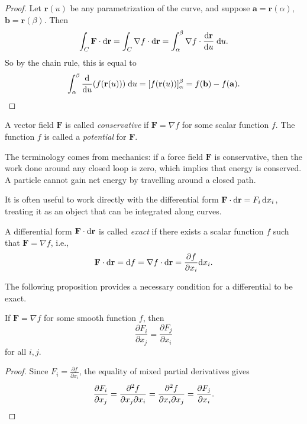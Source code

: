 \documentclass[a4paper]{article}
\begin{document}
\begin{proof}
  Let $\mathbf{r}(u)$ be any parametrization of the curve, and suppose $\mathbf{a} = \mathbf{r}(\alpha)$, $\mathbf{b} = \mathbf{r}(\beta)$. Then
  \[
    \int_C \mathbf{F}\cdot \mathrm{d} \mathbf{r} = \int_C\nabla f\cdot \mathrm{d} \mathbf{r} = \int_\alpha^\beta \nabla f\cdot \frac{\mathrm{d} \mathbf{r}}{\mathrm{d} u}\; \mathrm{d} u.
  \]
  So by the chain rule, this is equal to
  \[
    \int_\alpha^\beta \frac{\mathrm{d} }{\mathrm{d} u} (f(\mathbf{r}(u))) \;\mathrm{d} u = [f(\mathbf{r}(u))]_\alpha^\beta = f(\mathbf{b}) - f(\mathbf{a}).\qedhere
  \]
\end{proof}

\begin{defi}
  A vector field $\mathbf{F}$ is called \emph{conservative} if $\mathbf{F} = \nabla f$ for some scalar function $f$. The function $f$ is called a \emph{potential} for $\mathbf{F}$.
\end{defi}

\begin{rmk}
  The terminology comes from mechanics: if a force field $\mathbf{F}$ is conservative, then the work done around any closed loop is zero, which implies that energy is conserved. A particle cannot gain net energy by travelling around a closed path.
\end{rmk}

It is often useful to work directly with the differential form $\mathbf{F} \cdot \mathrm{d}\mathbf{r} = F_i \, \mathrm{d} x_i$, treating it as an object that can be integrated along curves.

\begin{defi}
  A differential form $\mathbf{F} \cdot \mathrm{d}\mathbf{r}$ is called \emph{exact} if there exists a scalar function $f$ such that $\mathbf{F} = \nabla f$, i.e.,
  \[
    \mathbf{F} \cdot \mathrm{d}\mathbf{r} = \mathrm{d} f = \nabla f \cdot \mathrm{d}\mathbf{r} = \frac{\partial f}{\partial x_i} \mathrm{d} x_i.
  \]
\end{defi}

The following proposition provides a necessary condition for a differential to be exact.

\begin{prop}
  If $\mathbf{F} = \nabla f$ for some smooth function $f$, then
  \[
    \frac{\partial F_i}{\partial x_j} = \frac{\partial F_j}{\partial x_i}
  \]
  for all $i, j$.
\end{prop}

\begin{proof}
  Since $F_i = \frac{\partial f}{\partial x_i}$, the equality of mixed partial derivatives gives
  \[
    \frac{\partial F_i}{\partial x_j} = \frac{\partial^2 f}{\partial x_j \partial x_i} = \frac{\partial^2 f}{\partial x_i \partial x_j} = \frac{\partial F_j}{\partial x_i}. \qedhere
  \]
\end{proof}
\end{document}
